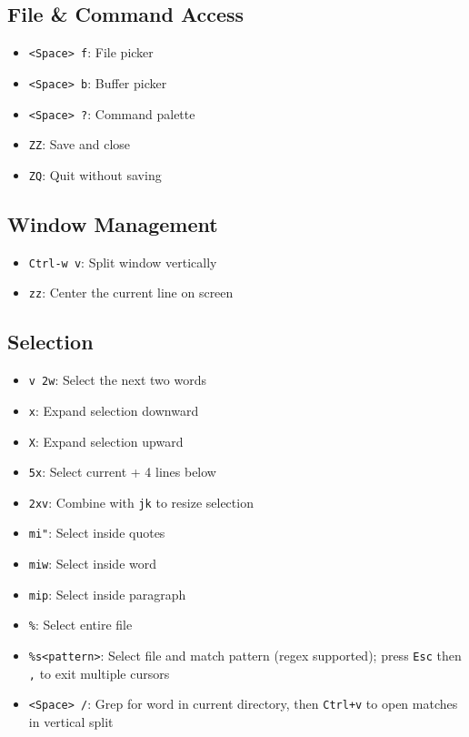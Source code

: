 \documentclass[
  letterpaper,
  DIV=11,
  numbers=noendperiod]{scrartcl}
\providecommand{\tightlist}{%
  \setlength{\itemsep}{0pt}\setlength{\parskip}{0pt}}\usepackage{longtable,booktabs,array}
\begin{document}
\subsection{\texorpdfstring{\textbf{File \& Command
Access}}{File \& Command Access}}\label{file-command-access}

\begin{itemize}
\tightlist
\item
  \texttt{\textless{}Space\textgreater{}\ f}: File picker
\item
  \texttt{\textless{}Space\textgreater{}\ b}: Buffer picker
\item
  \texttt{\textless{}Space\textgreater{}\ ?}: Command palette
\item
  \texttt{ZZ}: Save and close
\item
  \texttt{ZQ}: Quit without saving
\end{itemize}

\subsection{\texorpdfstring{\textbf{Window
Management}}{Window Management}}\label{window-management}

\begin{itemize}
\tightlist
\item
  \texttt{Ctrl-w\ v}: Split window vertically
\item
  \texttt{zz}: Center the current line on screen
\end{itemize}

\subsection{\texorpdfstring{\textbf{Selection}}{Selection}}\label{selection}

\begin{itemize}
\tightlist
\item
  \texttt{v\ 2w}: Select the next two words
\item
  \texttt{x}: Expand selection downward
\item
  \texttt{X}: Expand selection upward
\item
  \texttt{5x}: Select current + 4 lines below
\item
  \texttt{2xv}: Combine with \texttt{jk} to resize selection
\item
  \texttt{mi"}: Select inside quotes
\item
  \texttt{miw}: Select inside word
\item
  \texttt{mip}: Select inside paragraph
\item
  \texttt{\%}: Select entire file
\item
  \texttt{\%s\textless{}pattern\textgreater{}}: Select file and match
  pattern (regex supported); press \texttt{Esc} then \texttt{,} to exit
  multiple cursors
\item
  \texttt{\textless{}Space\textgreater{}\ /}: Grep for word in current
  directory, then \texttt{Ctrl+v} to open matches in vertical split
\end{itemize}
\end{document}
